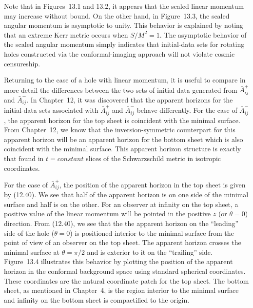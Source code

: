 
Note that in Figures~13.1 and 13.2, it appears that the scaled linear momentum
may increase without bound.  On the other hand, in Figure~13.3, the scaled
angular momentum is asymptotic to unity.  This behavior is explained by noting
that an extreme Kerr metric occurs when $S/M^2 = 1$.  The asymptotic behavior of
the scaled angular momentum simply indicates that initial-data sets for rotating
holes constructed via the conformal-imaging approach will not violate cosmic
censureship.

Returning to the case of a hole with linear momentum, it is useful to compare in
more detail the differences between the two sets of initial data generated from
$\bar{A}^+_{ij}$ and $\bar{A}^-_{ij}$.  In Chapter~12, it was discovered
that the apparent horizons for the initial-data sets associated with
$\bar{A}^+_{ij}$ and $\bar{A}^-_{ij}$ behave differently.  For the case of
$\bar{A}^-_{ij}$, the apparent horizon for the top sheet is coincident with the
minimal surface.  From Chapter~12, we know that the inversion-symmetric
counterpart for this apparent horizon will be an apparent horizon for the bottom
sheet which is also coincident with the minimal surface.  This apparent horizon
structure is exactly that found in $t=constant$ slices of the Schwarzschild
metric in isotropic coordinates.

For the case of $\bar{A}^+_{ij}$, the position of the apparent horizon in the top
sheet is given by (12.40).  We see that half of the apparent horizon is on one
side of the minimal surface and half is on the other.  For an observer at
infinity on the top sheet, a positive value of the linear momentum will be
pointed in the positive $z$ (or $\theta=0$) direction.  From (12.40), we see that
the the apparent horizon on the ``leading'' side of the hole ($\theta=0$) is
positioned interior to the minimal surface from the point of view of an observer
on the top sheet.  The apparent horizon crosses the minimal surface at
$\theta=\pi/2$ and is exterior to it on the ``trailing'' side.  Figure~13.4
illustrates this behavior by plotting the position of the apparent horizon in
the conformal background space using standard spherical coordinates.  These
coordinates are the natural coordinate patch for the top sheet.  The bottom
sheet, as mentioned in Chapter~4, is the region interior to the minimal surface
and infinity on the bottom sheet is compactified to the origin. 

